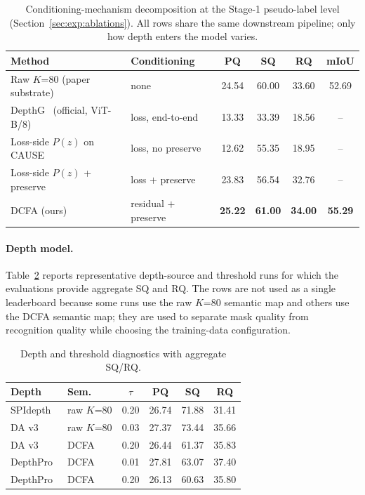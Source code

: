 \documentclass{article}
\begin{document}
\begin{table}[tbp]
\caption{Conditioning-mechanism decomposition at the Stage-1 pseudo-label level (Section~\ref{sec:exp:ablations}). All rows share the same downstream pipeline; only how depth enters the model varies.}
\label{tab:conditioning}
\centering
\scriptsize
\setlength{\tabcolsep}{3pt}
\begin{tabular}{@{}l l c c c c@{}}
\toprule
Method & Conditioning & PQ & SQ & RQ & mIoU \\
\midrule
Raw $K$=80 (paper substrate)        & none                  & 24.54 & 60.00 & 33.60 & 52.69 \\
DepthG~\cite{sick2024depthg} (official, ViT-B/8)          & loss, end-to-end      & 13.33 & 33.39 & 18.56 & -- \\
Loss-side $P(z)$ on CAUSE~\cite{kim2024cause}           & loss, no preserve     & 12.62 & 55.35 & 18.95 & -- \\
Loss-side $P(z)$ + preserve         & loss $+$ preserve     & 23.83 & 56.54 & 32.76 & -- \\
DCFA (ours)                         & residual $+$ preserve & \textbf{25.22} & \textbf{61.00} & \textbf{34.00} & \textbf{55.29} \\
\bottomrule
\end{tabular}
\end{table}

\paragraph{Depth model.}
Table~\ref{tab:depth} reports representative depth-source and threshold runs for which the evaluations provide aggregate SQ and RQ. The rows are not used as a single leaderboard because some runs use the raw $K$=80 semantic map and others use the DCFA semantic map; they are used to separate mask quality from recognition quality while choosing the training-data configuration.

\begin{table}[tbp]
\caption{Depth and threshold diagnostics with aggregate SQ/RQ.}
\label{tab:depth}
\centering
\small
\setlength{\tabcolsep}{3pt}
\begin{tabular}{l l c c c c}
\toprule
Depth & Sem. & $\tau$ & PQ & SQ & RQ \\
\midrule
SPIdepth & raw $K$=80 & 0.20 & 26.74 & 71.88 & 31.41 \\
DA v3~\cite{lin2025da3} & raw $K$=80 & 0.03 & 27.37 & 73.44 & 35.66 \\
DA v3~\cite{lin2025da3} & DCFA & 0.20 & 26.44 & 61.37 & 35.83 \\
DepthPro~\cite{bochkovskii2024depthpro} & DCFA & 0.01 & 27.81 & 63.07 & 37.40 \\
DepthPro~\cite{bochkovskii2024depthpro} & DCFA & 0.20 & 26.13 & 60.63 & 35.80 \\
\bottomrule
\end{tabular}
\end{table}
\end{document}
